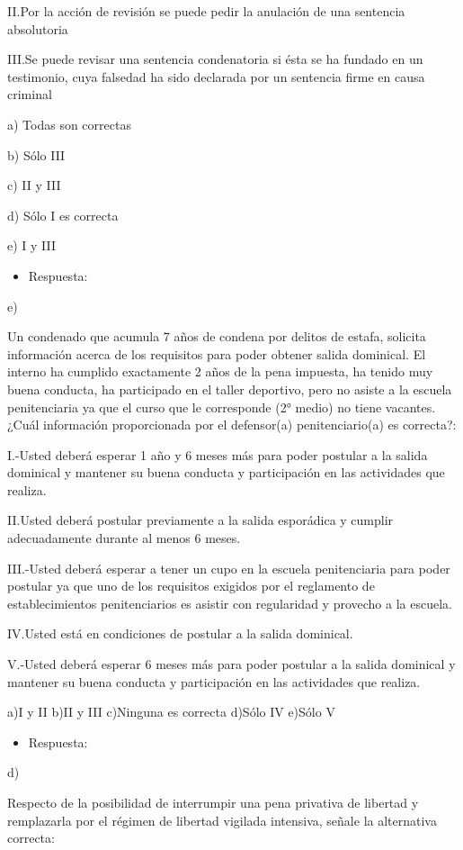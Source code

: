 \documentclass[letterpaper, 11pt]{article}
\begin{document}
II.Por la acción de revisión se puede pedir la anulación de una sentencia absolutoria

III.Se puede revisar una sentencia condenatoria si ésta se ha fundado en un
testimonio, cuya falsedad ha sido declarada por un sentencia firme en causa
criminal

a) Todas son correctas

b) Sólo III

c) II y III

d) Sólo I es correcta

e) I y III

\begin{itemize}
\item Respuesta:
\end{itemize}
e)


Un condenado que acumula 7 años de condena por delitos de estafa, solicita
información acerca de los requisitos para poder obtener salida dominical. El
interno ha cumplido exactamente 2 años de la pena impuesta, ha tenido muy
buena conducta, ha participado en el taller deportivo, pero no asiste a la escuela
penitenciaria ya que el curso que le corresponde (2° medio) no tiene vacantes.
¿Cuál información proporcionada por el defensor(a) penitenciario(a) es correcta?:

I.-Usted deberá esperar 1 año y 6 meses más para poder postular a la salida
dominical y mantener su buena conducta y participación en las actividades que
realiza.

II.Usted deberá postular previamente a la salida esporádica y cumplir
adecuadamente durante al menos 6 meses.

III.-Usted deberá esperar a tener un cupo en la escuela penitenciaria para poder
postular ya que uno de los requisitos exigidos por el reglamento de
establecimientos penitenciarios es asistir con regularidad y provecho a la escuela.

IV.Usted está en condiciones de postular a la salida dominical.

V.-Usted deberá esperar 6 meses más para poder postular a la salida dominical y
mantener su buena conducta y participación en las actividades que realiza.

a)I y II
b)II y III
c)Ninguna es correcta
d)Sólo IV
e)Sólo V

\begin{itemize}
\item Respuesta:
\end{itemize}
d)

Respecto de la posibilidad de interrumpir una pena privativa de libertad y
remplazarla por el régimen de libertad vigilada intensiva, señale la alternativa
correcta:
\end{document}
